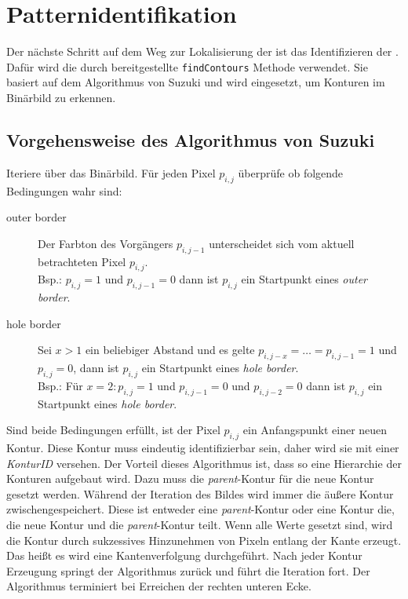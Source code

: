 \chapter{Patternidentifikation}
Der nächste Schritt auf dem Weg zur Lokalisierung der \QRCodes ist das Identifizieren der \fps. Dafür wird die durch \OpenCV bereitgestellte \texttt{findContours} Methode verwendet. Sie basiert auf dem Algorithmus von Suzuki und wird eingesetzt, um Konturen im Binärbild zu erkennen.

\section{Vorgehensweise des Algorithmus von Suzuki} \label{suzuki}
Iteriere über das Binärbild. Für jeden Pixel $p_{i,j}$ überprüfe ob folgende Bedingungen wahr sind:
\begin{description}
	\item[outer border] Der Farbton des Vorgängers $p_{i,j-1}$ unterscheidet sich vom aktuell betrachteten Pixel $p_{i,j}$. \\Bsp.: $p_{i,j} = 1$ und $p_{i,j-1} = 0$ dann ist $p_{i,j}$ ein Startpunkt eines \emph{outer border}.
	\item[hole border] Sei $x > 1$ ein beliebiger Abstand und es gelte $p_{i,j-x} =\ldots = p_{i,j-1}= 1$ und $p_{i,j} = 0$, dann ist $p_{i,j}$ ein Startpunkt eines \emph{hole border}.
	\\Bsp.: Für $x=2: p_{i,j} = 1$ und $p_{i,j-1} = 0$ und $p_{i,j-2} = 0$ dann ist $p_{i,j}$ ein Startpunkt eines \emph{hole border}.
\end{description}
Sind beide Bedingungen erfüllt, ist der Pixel $p_{i,j}$ ein Anfangspunkt einer neuen Kontur. Diese Kontur muss eindeutig identifizierbar sein, daher wird sie mit einer \emph{KonturID} versehen. Der Vorteil dieses Algorithmus ist, dass so eine Hierarchie der Konturen aufgebaut wird. Dazu muss die \emph{parent}-Kontur für die neue Kontur gesetzt werden. Während der Iteration des Bildes wird immer die äußere Kontur zwischengespeichert. Diese ist entweder eine \emph{parent}-Kontur oder eine Kontur die, die neue Kontur und die \emph{parent}-Kontur teilt. Wenn alle Werte gesetzt sind, wird die Kontur durch sukzessives Hinzunehmen von Pixeln entlang der Kante erzeugt. Das heißt es wird eine Kantenverfolgung durchgeführt. Nach jeder Kontur Erzeugung springt der Algorithmus zurück und führt die Iteration fort. Der Algorithmus terminiert bei Erreichen der rechten unteren Ecke.


